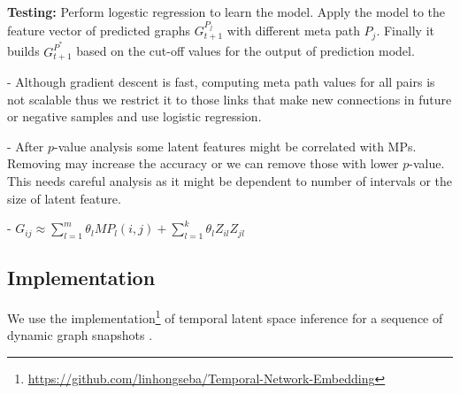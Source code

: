 \textbf{Testing:} Perform logestic regression to learn the model. Apply the model to the feature vector of predicted graphs $G^{P_j}_{t+1}$ with different meta path $P_j$. Finally it builds $G^{P^*}_{t+1}$ based on the cut-off values for the output of prediction model.




- Although gradient descent is fast, computing meta path values for all pairs is not scalable thus we restrict it to those links that make new connections in future or negative samples and use logistic regression. 

- After $p$-value analysis some latent features might be correlated with MPs. Removing may increase the accuracy or we can remove those with lower $p$-value. This needs careful analysis as it might be dependent to number of intervals or the size of latent feature.

- $G_{ij} \approx  \sum_{l=1}^{m} \theta_l MP_l(i,j) + \sum_{l=1}^{k} \theta_l Z_{il}Z_{jl}$



\subsection{Implementation}

We use the implementation\footnote{\url{https://github.com/linhongseba/Temporal-Network-Embedding}} of temporal latent space inference for a sequence of dynamic graph snapshots \cite{Zhu2016}.









    

